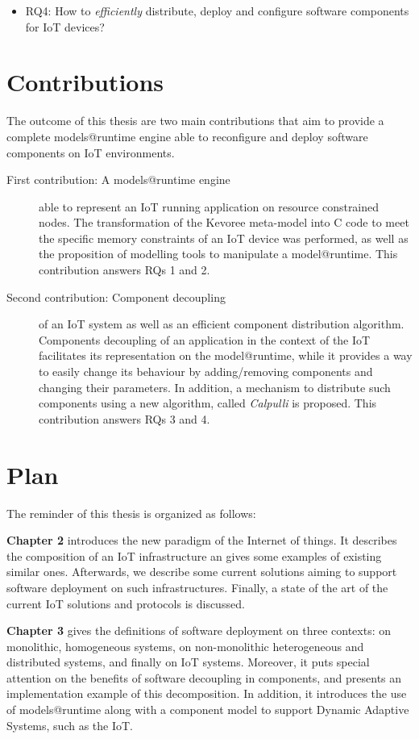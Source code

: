 \begin{itemize}
	\item RQ4: How to \textit{efficiently} distribute, deploy and configure software components for IoT devices?
\end{itemize}

\section{Contributions}
The outcome of this thesis are two main contributions that aim to provide a complete models@runtime engine able to reconfigure and deploy software components on IoT environments.
\begin{description}
	\item[First contribution: A models@runtime engine] able to represent an IoT running application on resource constrained nodes. The transformation of the Kevoree meta-model into C code to meet the specific memory constraints of an IoT device was performed, as well as the proposition of modelling tools to manipulate a model@runtime.
	This contribution answers RQs 1 and 2.
	\item[Second contribution: Component decoupling] of an IoT system as well as an efficient component distribution algorithm. Components decoupling of an application in the context of the IoT facilitates its representation on the model@runtime, while it provides a way to easily change its behaviour by adding/removing components and changing their parameters.
	In addition, a mechanism to distribute such components using a new algorithm, called \textit{Calpulli} is proposed.
	This contribution answers RQs 3 and 4.
\end{description}

\section{Plan}
The reminder of this thesis is organized as follows:

\textbf{Chapter 2} introduces the new paradigm of the Internet of things. It describes the composition of an IoT infrastructure an gives some examples of existing similar ones.
Afterwards, we describe some current solutions aiming to support software deployment on such infrastructures.
Finally, a state of the art of the current IoT solutions and protocols is discussed.

\textbf{Chapter 3} gives the definitions of software deployment on three contexts: on monolithic, homogeneous systems, on non-monolithic heterogeneous and distributed systems, and finally on IoT systems.
Moreover, it puts special attention on the benefits of software decoupling in components, and presents an implementation example of this decomposition.
In addition, it introduces the use of models@runtime along with a component model to support Dynamic Adaptive Systems, such as the IoT.

